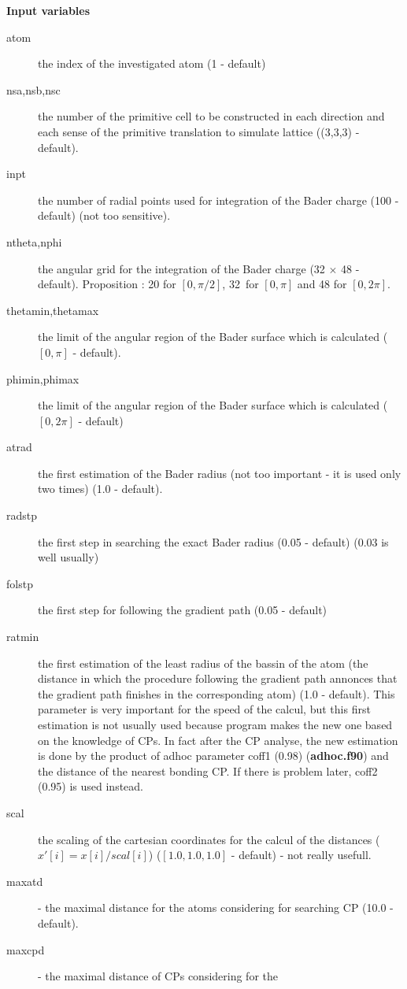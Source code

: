 \documentclass[11pt]{article}
\begin{document}
{\bf Input variables}\\
\begin{description}
\item [atom] the index of the investigated atom (1 - default)
\item [nsa,nsb,nsc] the number of the primitive cell to be constructed
in each direction and each sense of the primitive translation to
simulate lattice ((3,3,3) - default).
\item [inpt] the number of radial points used for integration of the
Bader charge (100 - default) (not too sensitive).
\item [ntheta,nphi] the angular grid for the integration of the Bader
charge (32 $\times$ 48 - default). Proposition : 20 for $[0,\pi/2]$,
32~for $[0,\pi]$ and 48 for $[0,2\pi]$.
\item [thetamin,thetamax] the limit of the angular region of the
Bader surface which is calculated ($[0,\pi]$ - default).
\item [phimin,phimax] the limit of the angular region of the
Bader surface which is calculated ($[0,2\pi]$ - default)
\item [atrad] the first estimation of the Bader radius (not too
important - it is used only two times) (1.0 - default).
\item [radstp] the first step in searching the exact Bader radius
(0.05 - default) (0.03 is well usually)
\item [folstp] the first step for following the gradient path
(0.05 - default)
\item [ratmin] the first estimation of the least radius of the bassin of the
atom (the distance in which the procedure following the gradient path
annonces that the gradient path finishes in the corresponding atom)
(1.0 - default). This parameter is very important for the speed of the
calcul, but this first estimation is not usually used because program
makes the new one based on the knowledge of CPs. In fact after
the CP analyse, the new estimation is done by the product of adhoc
parameter coff1 (0.98) ({\bf adhoc.f90}) and the distance of the nearest
bonding CP. If there is problem later, coff2 (0.95) is used instead.
\item [scal] the scaling of the cartesian coordinates for the calcul
of the distances ($x'[i]=x[i]/scal[i]$)
($[1.0,1.0,1.0]$ - default) - not really usefull.
\item [maxatd] - the maximal distance for the atoms considering for
searching CP (10.0 - default).
\item [maxcpd] - the maximal distance of CPs considering for the

\end{description}
\end{document}
